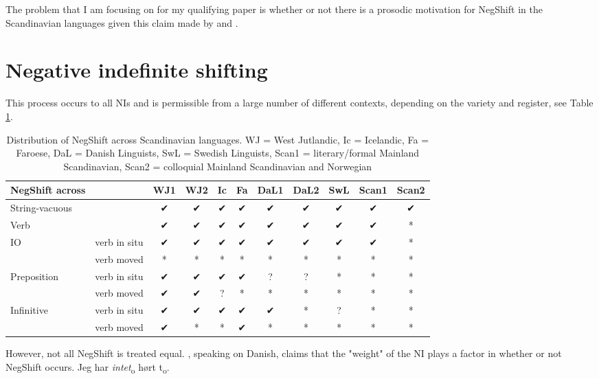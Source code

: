\documentclass[12pt, letterpaper]{article}
\begin{document}
The problem that I am focusing on for my qualifying paper is whether or not there is a prosodic motivation for NegShift in the Scandinavian languages given this claim made by \citet{christensenInterfacesNegationSyntax2005} and \citet{penkaNegativeIndefinites2011}. 
 
\section{Negative indefinite shifting} \label{sec:NEGSHIFT}

\ea 
\ex This process occurs to all NIs and is permissible from a large number of different contexts, depending on the variety and register, see Table \ref{tab:Distribution}. 
\begin{table}[h!]
	\centering
	\caption{Distribution of NegShift across Scandinavian languages. WJ = West Jutlandic, Ic = Icelandic, Fa = Faroese, DaL = Danish Linguists, SwL = Swedish Linguists, Scan1 = literary/formal Mainland Scandinavian, Scan2 = colloquial Mainland Scandinavian and Norwegian}
	\label{tab:Distribution}
\begin{tabular}{llccccccccc}
	\hline 
	NegShift across &  & WJ1 & WJ2 & Ic & Fa & DaL1 & DaL2 & SwL & Scan1 & Scan2 \\ 
	\hline 
	String-vacuous &  & ✔︎ & ✔︎ & ✔︎ & ✔︎ & ✔︎ & ✔︎ & ✔︎ & ✔︎ & ✔︎ \\ 
	Verb &  & ✔︎ & ✔︎ & ✔︎ & ✔︎ & ✔︎ & ✔︎ & ✔︎ & ✔︎ & * \\ 
	IO & verb in situ & ✔︎ & ✔︎ & ✔︎ & ✔︎ & ✔︎ & ✔︎ & ✔︎ & ✔︎ & * \\ 
	& verb moved & * & * & * & * & * & * & * & * & * \\ 
	Preposition & verb in situ & ✔︎ & ✔︎ & ✔︎ & ✔︎ & ? & ? & * & * & * \\ 
	& verb moved & ✔︎ & ✔︎ & ? & * & * & * & * & * & * \\ 
	Infinitive & verb in situ & ✔︎ & ✔︎ & ✔︎ & ✔︎ & ✔︎ & * & ? & * & * \\ 
	& verb moved & ✔︎ & * & * & ✔︎ & * & * & * & * & * \\ 
	\hline 
\end{tabular} 
\end{table}
\ex However, not all NegShift is treated equal. \citet[65f]{christensenInterfacesNegationSyntax2005}, speaking on Danish, claims that the "weight" of the NI plays a factor in whether or not NegShift occurs. 
	\ea
	\gll Jeg har \textit{intet}\textsubscript{o} hørt t\textsubscript{o}.\\
\end{document}
